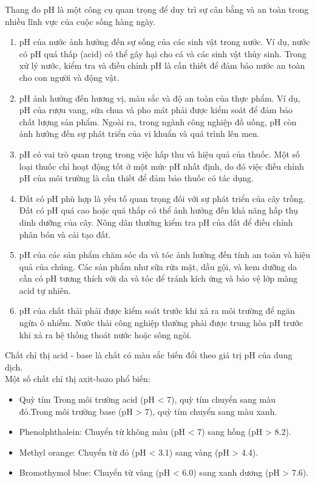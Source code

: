 \begin{tcolorbox}[
	enhanced jigsaw,
	frame hidden,
	colback=\mycolor!15,
	arc is angular,
	breakable
	]
	Thang đo pH là một công cụ quan trọng để duy trì sự cân bằng và an toàn trong nhiều lĩnh vực của cuộc sống hàng ngày.
\begin{enumerate}
	\item {}
	pH của nước ảnh hưởng đến sự sống của các sinh vật trong nước. Ví dụ, nước có pH quá thấp (acid) có thể gây hại cho cá và các sinh vật thủy sinh. Trong xử lý nước, kiểm tra và điều chỉnh pH là cần thiết để đảm bảo nước an toàn cho con người và động vật.
	\item {}
	 pH ảnh hưởng đến hương vị, màu sắc và độ an toàn của thực phẩm. Ví dụ, pH của rượu vang, sữa chua và pho mát phải được kiểm soát để đảm bảo chất lượng sản phẩm. Ngoài ra, trong ngành công nghiệp đồ uống, pH còn ảnh hưởng đến sự phát triển của vi khuẩn và quá trình lên men.
	\item {}
	pH có vai trò quan trọng trong việc hấp thu và hiệu quả của thuốc. Một số loại thuốc chỉ hoạt động tốt ở một mức pH nhất định, do đó việc điều chỉnh pH của môi trường là cần thiết để đảm bảo thuốc có tác dụng.
	\item {}
	 Đất có pH phù hợp là yếu tố quan trọng đối với sự phát triển của cây trồng. Đất có pH quá cao hoặc quá thấp có thể ảnh hưởng đến khả năng hấp thụ dinh dưỡng của cây. Nông dân thường kiểm tra pH của đất để điều chỉnh phân bón và cải tạo đất.
	\item {}
	pH của các sản phẩm chăm sóc da và tóc ảnh hưởng đến tính an toàn và hiệu quả của chúng. Các sản phẩm như sữa rửa mặt, dầu gội, và kem dưỡng da cần có pH tương thích với da và tóc để tránh kích ứng và bảo vệ lớp màng acid tự nhiên.
	\item {}
	pH của chất thải phải được kiểm soát trước khi xả ra môi trường để ngăn ngừa ô nhiễm. Nước thải công nghiệp thường phải được trung hòa pH trước khi xả ra hệ thống thoát nước hoặc sông ngòi.
\end{enumerate}
\end{tcolorbox}
\vspace{0.5cm}
\begin{tomtat}
	Chất chỉ thị acid - base là chất có màu sắc biến đổi theo giá trị pH của dung dịch.\\
	Một số chất chỉ thị axit-bazo phổ biến:
	\begin{itemize}
		\item Quỳ tím Trong môi trường acid (pH < 7), quỳ tím chuyển sang màu đỏ.Trong môi trường base (pH > 7), quỳ tím chuyển sang màu xanh.
		\item  Phenolphthalein: Chuyển từ không màu (pH < 7) sang hồng (pH > 8.2).
		\item  Methyl orange: Chuyển từ đỏ (pH < 3.1) sang vàng (pH > 4.4).
		\item  Bromothymol blue: Chuyển từ vàng (pH < 6.0) sang xanh dương (pH > 7.6).
	\end{itemize}
\end{tomtat}
